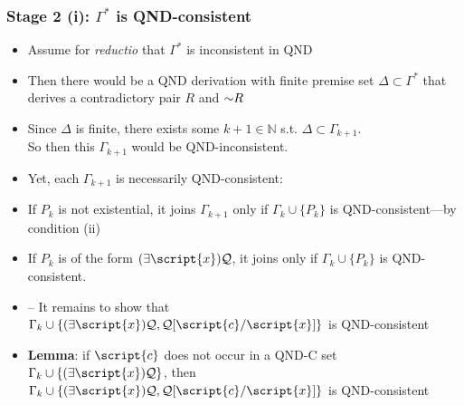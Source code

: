 \begin{frame}
\frametitle{Stage 2 (i): $\Gamma^{\ast}$ is QND-consistent}

\begin{itemize}[<+->]

\item Assume for \textit{reductio} that $\Gamma^{\ast}$ is inconsistent in QND

\item Then there would be a QND derivation with finite premise set $\Delta \subset \Gamma^{\ast}$ that derives a contradictory pair $R$ and $\enot R$

\item Since $\Delta$ is finite, there exists some $k+1 \in \mathbb{N}$ s.t. $\Delta \subset \Gamma_{k+1}$. \\ So then this $\Gamma_{k+1}$ would be \textcolor{OGlyallpink}{QND-inconsistent}. 

\item Yet, each $\Gamma_{k+1}$ is necessarily \alert{QND-consistent}: 

\bi


\item If $P_k$ is not existential, it joins $\Gamma_{k+1}$ only if $\Gamma_k \cup \{P_k \}$ is QND-consistent---by condition (ii)

\item If $P_k$ is of the form $\qt{\exists}{\script{x}} \metav{Q}$, it joins only if $\Gamma_k \cup \{P_k \}$ is QND-consistent. 
\item[] -- It remains to show that $\Gamma_k \cup \{\qt{\exists}{\script{x}} \metav{Q}, \metav{Q}\substitute{\script{x}}{\script{c}} \}$ is QND-consistent

\item \textbf{\textcolor{highlightB}{Lemma}}: if $\script{c}$ does not occur in a QND-C set $\Gamma_k \cup \{ \qt{\exists}{\script{x}} \metav{Q} \}$, then $\Gamma_k \cup \{\qt{\exists}{\script{x}} \metav{Q}, \metav{Q}\substitute{\script{x}}{\script{c}} \}$ is QND-consistent




\end{itemize}
\end{frame}
